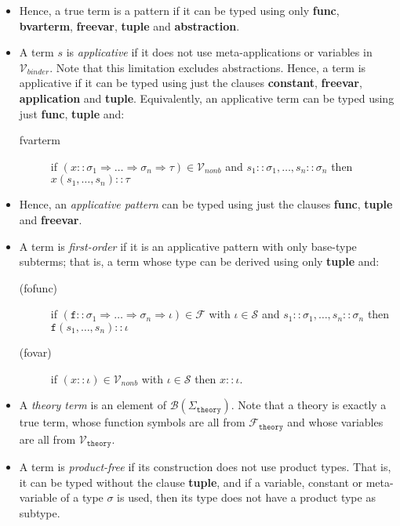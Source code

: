 \documentclass{lmcs}
\theoremstyle{theorem}\newtheorem{theorem}{Theorem}
\theoremstyle{theorem}\newtheorem{lemma}[theorem]{Lemma}
\theoremstyle{theorem}\newtheorem{corollary}[theorem]{Corollary}
\theoremstyle{definition}\newtheorem{definition}[theorem]{Definition}
\theoremstyle{definition}\newtheorem{example}[theorem]{Example}
\newcommand{\F}{\mathcal{F}}
\newcommand{\thF}{\mathcal{F}_{\mathtt{theory}}}
\newcommand{\thSigma}{\Sigma_{\mathtt{theory}}}
\newcommand{\thV}{\mathcal{V}_{\mathtt{theory}}}
\newcommand{\Vfree}{\mathcal{V}_{\mathit{nonb}}}
\newcommand{\Vbound}{\mathcal{V}_{\mathit{binder}}}
\newcommand{\Sorts}{\mathcal{S}}
\newcommand{\MTerms}{\mathcal{B}}
\newcommand{\asort}{\iota}
\newcommand{\atype}{\sigma}
\newcommand{\btype}{\tau}
\newcommand{\identifier}[1]{\mathtt{#1}}
\newcommand{\afun}{\identifier{f}}
\newcommand{\avar}{x}
\newcommand{\clause}[1]{\textbf{#1}}
\newcommand{\arrtype}{\Rightarrow}
\begin{document}
\begin{itemize}
\item Hence, a true term is a pattern if it can be typed using only
  \clause{func}, \clause{bvarterm}, \clause{freevar}, \clause{tuple} and
  \clause{abstraction}.

\item A term $s$ is \emph{applicative} if it does not use meta-applications or
  variables in $\Vbound$.  Note that this limitation excludes abstractions.
  Hence, a term is applicative if it can be typed using just the clauses
  \clause{constant}, \clause{freevar}, \clause{application} and \clause{tuple}.
  Equivalently, an applicative term can be typed using just \clause{func},
  \clause{tuple} and:
  \begin{description}
  \item[fvarterm] if $(\avar :: \atype_1 \arrtype \dots \arrtype \atype_n
    \arrtype \btype) \in \Vfree$ and $s_1 :: \atype_1,\dots,s_n :: \atype_n$
    then $\avar(s_1,\dots,s_n) :: \btype$
  \end{description}

\item Hence, an \emph{applicative pattern} can be typed using just the clauses
  \clause{func}, \clause{tuple} and \clause{freevar}.
\item A term is \emph{first-order} if it is an applicative pattern with only
  base-type subterms; that is, a term whose type can be derived using only
  \clause{tuple} and:
  \begin{description}
  \item[(fofunc)] if $(\afun :: \atype_1 \arrtype \dots \arrtype \atype_n
    \arrtype \asort) \in \F$ with $\asort \in \Sorts$ and $s_1 :: \atype_1,
    \dots,s_n :: \atype_n$ then $\afun(s_1,\dots,s_n) :: \asort$
  \item[(fovar)] if $(\avar :: \asort) \in \Vfree$ with $\asort \in \Sorts$ then
    $\avar :: \asort$.
  \end{description}

\item A \emph{theory term} is an element of $\MTerms(\thSigma)$.  Note that a
  theory is exactly a true term, whose function symbols are all from
  $\thF$ and whose variables are all from $\thV$.

\item A term is \emph{product-free} if its construction does not use product
  types.  That is, it can be typed without the clause \clause{tuple}, and if
  a variable, constant or meta-variable of a type $\atype$ is used, then its
  type does not have a product type as subtype.
\end{itemize}
\end{document}
